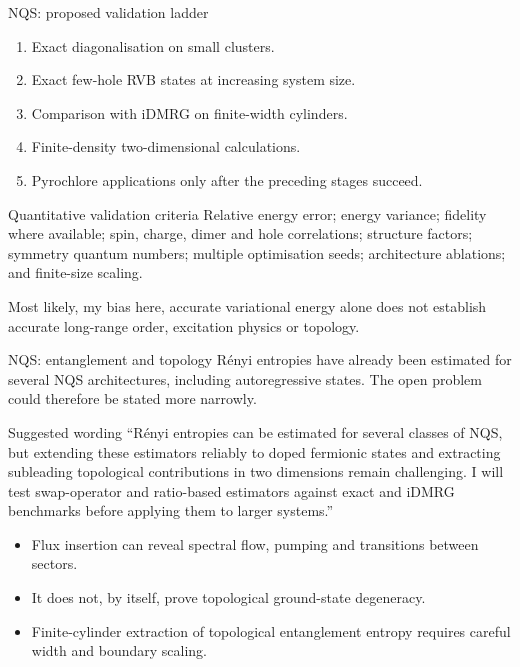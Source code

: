 \documentclass[aspectratio=169,11pt]{beamer}
\begin{document}
\begin{frame}{NQS: proposed validation ladder}
\begin{enumerate}
  \item Exact diagonalisation on small clusters.
  \item Exact few-hole RVB states at increasing system size.
  \item Comparison with iDMRG on finite-width cylinders.
  \item Finite-density two-dimensional calculations.
  \item Pyrochlore applications only after the preceding stages succeed.
\end{enumerate}

\begin{block}{Quantitative validation criteria}
Relative energy error; energy variance; fidelity where available; spin, charge, dimer and hole correlations; structure factors; symmetry quantum numbers; multiple optimisation seeds; architecture ablations; and finite-size scaling.
\end{block}
Most likely, my bias here, 
accurate variational energy alone does not establish accurate long-range order, excitation physics or topology.
\end{frame}

\begin{frame}{NQS: entanglement and topology}
Rényi entropies have already been estimated for several NQS architectures, including autoregressive states. The open problem could therefore be stated more narrowly.

\begin{block}{Suggested wording}
``Rényi entropies can be estimated for several classes of NQS, but extending these estimators reliably to doped fermionic states and extracting subleading topological contributions in two dimensions remain challenging. I will test swap-operator and ratio-based estimators against exact and iDMRG benchmarks before applying them to larger systems.''
\end{block}

\begin{itemize}
  \item Flux insertion can reveal spectral flow, pumping and transitions between sectors.
  \item It does not, by itself, prove topological ground-state degeneracy.
  \item Finite-cylinder extraction of topological entanglement entropy requires careful width and boundary scaling.
\end{itemize}
\end{frame}
\end{document}

